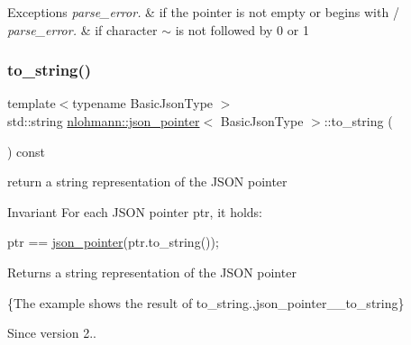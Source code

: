 \begin{DoxyExceptions}{Exceptions}
{\em parse\+\_\+error.} & if the pointer is not empty or begins with \textquotesingle{}/\textquotesingle{} \\
\hline
{\em parse\+\_\+error.} & if character \textquotesingle{}$\sim$\textquotesingle{} is not followed by \textquotesingle{}0\textquotesingle{} or \textquotesingle{}1\textquotesingle{} \\
\hline
\end{DoxyExceptions}
\mbox{\label{classnlohmann_1_1json__pointer_a3d4b15d32d096e3776c5d2c773b524f5}} 
\subsubsection{\texorpdfstring{to\+\_\+string()}{to\_string()}}
{\footnotesize\ttfamily template$<$typename Basic\+Json\+Type $>$ \\
std\+::string \mbox{\hyperlink{classnlohmann_1_1json__pointer}{nlohmann\+::json\+\_\+pointer}}$<$ Basic\+Json\+Type $>$\+::to\+\_\+string (\begin{DoxyParamCaption}{ }\end{DoxyParamCaption}) const\hspace{0.3cm}{\ttfamily [inline]}}



return a string representation of the J\+S\+ON pointer 

\begin{DoxyInvariant}{Invariant}
For each J\+S\+ON pointer {\ttfamily ptr}, it holds\+: 
\begin{DoxyCode}
ptr == \mbox{\hyperlink{classnlohmann_1_1json__pointer_a7f32d7c62841f0c4a6784cf741a6e4f8}{json\_pointer}}(ptr.to\_string());
\end{DoxyCode}

\end{DoxyInvariant}
\begin{DoxyReturn}{Returns}
a string representation of the J\+S\+ON pointer
\end{DoxyReturn}
\{The example shows the result of {\ttfamily to\+\_\+string}.,json\+\_\+pointer\+\_\+\+\_\+to\+\_\+string\}

\begin{DoxySince}{Since}
version 2.. 
\end{DoxySince}
\mbox{\label{classnlohmann_1_1json__pointer_a920065221e3c81676c3211c100d024a7}} 
